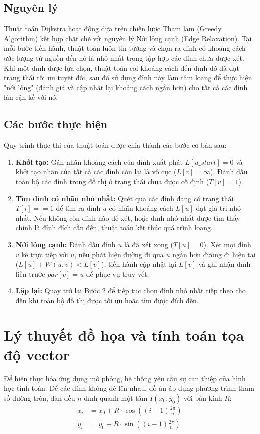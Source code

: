 \documentclass[12pt,a4paper,oneside]{report}
\begin{document}
\subsection{Nguyên lý}
Thuật toán Dijkstra hoạt động dựa trên chiến lược Tham lam (Greedy Algorithm) kết hợp chặt chẽ với nguyên lý Nới lỏng cạnh (Edge Relaxation). Tại mỗi bước tiến hành, thuật toán luôn tin tưởng và chọn ra đỉnh có khoảng cách ước lượng từ nguồn đến nó là nhỏ nhất trong tập hợp các đỉnh chưa được xét. Khi một đỉnh được lựa chọn, thuật toán coi khoảng cách đến đỉnh đó đã đạt trạng thái tối ưu tuyệt đối, sau đó sử dụng đỉnh này làm tâm loang để thực hiện "nới lỏng" (đánh giá và cập nhật lại khoảng cách ngắn hơn) cho tất cả các đỉnh lân cận kề với nó.

\subsection{Các bước thực hiện}
Quy trình thực thi của thuật toán được chia thành các bước cơ bản sau:
\begin{enumerate}
    \item \textbf{Khởi tạo:} Gán nhãn khoảng cách của đỉnh xuất phát $L[u\_{start}] = 0$ và khởi tạo nhãn của tất cả các đỉnh còn lại là vô cực ($L[v] = \infty$). Đánh dấu toàn bộ các đỉnh trong đồ thị ở trạng thái chưa được cố định ($T[v] = 1$).
    \item \textbf{Tìm đỉnh có nhãn nhỏ nhất:} Quét qua các đỉnh đang có trạng thái $T[i] == 1$ để tìm ra đỉnh $u$ có nhãn khoảng cách $L[u]$ đạt giá trị nhỏ nhất. Nếu không còn đỉnh nào để xét, hoặc đỉnh nhỏ nhất được tìm thấy chính là đỉnh đích cần đến, thuật toán kết thúc quá trình loang.
    \item \textbf{Nới lỏng cạnh:} Đánh dấu đỉnh $u$ là đã xét xong ($T[u] = 0$). Xét mọi đỉnh $v$ kề trực tiếp với $u$, nếu phát hiện đường đi qua $u$ ngắn hơn đường đi hiện tại ($L[u] + W(u, v) < L[v]$), tiến hành cập nhật lại $L[v]$ và ghi nhận đỉnh liền trước $par[v] = u$ để phục vụ truy vết.
    \item \textbf{Lặp lại:} Quay trở lại Bước 2 để tiếp tục chọn đỉnh nhỏ nhất tiếp theo cho đến khi toàn bộ đồ thị được tối ưu hoặc tìm được đích đến.
\end{enumerate}



\section{Lý thuyết đồ họa và tính toán tọa độ vector}
Để hiện thực hóa ứng dụng mô phỏng, hệ thống yêu cầu sự can thiệp của hình học tính toán. 
Để các đỉnh không đè lên nhau, đồ án áp dụng phương trình tham số đường tròn, dàn đều $n$ đỉnh quanh một tâm $I(x_0, y_0)$ với bán kính $R$:
\begin{align}
    x_i &= x_0 + R \cdot \cos\left((i - 1) \frac{2\pi}{n}\right) \\
    y_i &= y_0 + R \cdot \sin\left((i - 1) \frac{2\pi}{n}\right)
\end{align}
\end{document}

